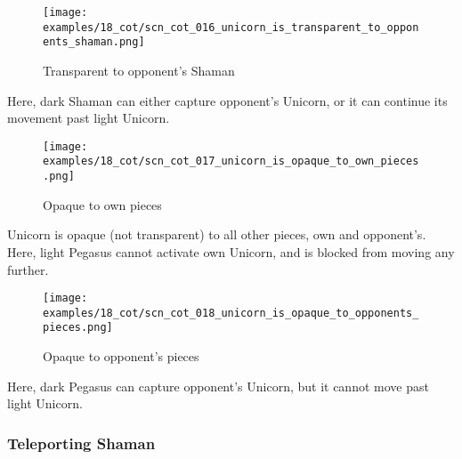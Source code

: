 \noindent
\begin{wrapfigure}[4]{l}{0.4\textwidth}
\centering
\texttt{[image: examples/18\_cot/scn\_cot\_016\_unicorn\_is\_transparent\_to\_opponents\_shaman.png]}
\vspace*{-1.4\baselineskip}
\caption{Transparent to opponent's Shaman}
\label{fig:scn_cot_016_unicorn_is_transparent_to_opponents_shaman}
\end{wrapfigure}
Here, dark Shaman can either capture opponent's Unicorn, or it can continue its movement
past light Unicorn.

\vspace*{1.7\baselineskip}
\noindent
\begin{wrapfigure}[6]{l}{0.4\textwidth}
\centering
\texttt{[image: examples/18\_cot/scn\_cot\_017\_unicorn\_is\_opaque\_to\_own\_pieces.png]}
\vspace*{-1.4\baselineskip}
\caption{Opaque to own pieces}
\label{fig:scn_cot_017_unicorn_is_opaque_to_own_pieces}
\end{wrapfigure}
Unicorn is opaque (not transparent) to all other pieces, own and opponent's. \newline
\indent
Here, light Pegasus cannot activate own Unicorn, and is blocked from moving any further.

\vspace*{.7\baselineskip}
\noindent
\begin{wrapfigure}[3]{l}{0.4\textwidth}
\centering
\texttt{[image: examples/18\_cot/scn\_cot\_018\_unicorn\_is\_opaque\_to\_opponents\_pieces.png]}
\vspace*{-1.4\baselineskip}
\caption{Opaque to opponent's pieces}
\label{fig:scn_cot_018_unicorn_is_opaque_to_opponents_pieces}
\end{wrapfigure}
Here, dark Pegasus can capture opponent's Unicorn, but it cannot move past light Unicorn.

\clearpage %

\subsubsection*{Teleporting Shaman}
\label{sec:Conquest of Tlalocan/Shaman/Movement/Teleporting Shaman}

